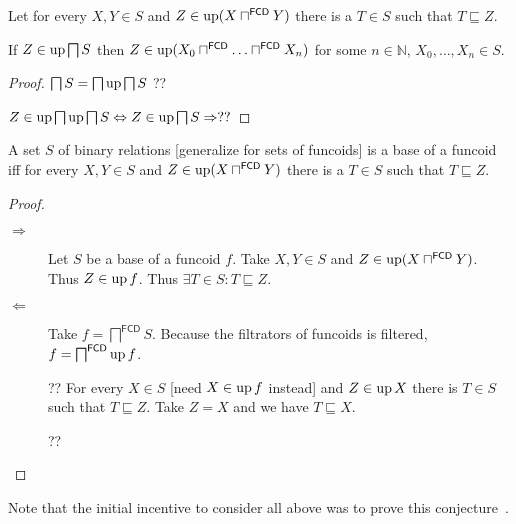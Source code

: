 \begin{lem}
  Let for every $X, Y \in S$ and $Z \in \operatorname{up} (X
  \sqcap^{\mathsf{FCD}} Y)$ there is a $T \in S$ such that $T
  \sqsubseteq Z$.
  
  If $Z \in \operatorname{up} \bigsqcap S$ then $Z \in \operatorname{up} (X_0
  \sqcap^{\mathsf{FCD}} \ldots \sqcap^{\mathsf{FCD}} X_n)$ for
  some $n \in \mathbb{N}$, $X_0, \ldots, X_n \in S$.
\end{lem}

\begin{proof}
  $\bigsqcap S = \bigsqcap \operatorname{up} \bigsqcap S$ ??
  
  $Z \in \operatorname{up} \bigsqcap \operatorname{up} \bigsqcap S \Leftrightarrow Z \in
  \operatorname{up} \bigsqcap S \Rightarrow ? ?$
\end{proof}

\begin{prop}
  A set $S$ of binary relations [generalize for sets of funcoids] is a base of
  a funcoid iff for every $X, Y \in S$ and $Z \in \operatorname{up} (X
  \sqcap^{\mathsf{FCD}} Y)$ there is a $T \in S$ such that $T
  \sqsubseteq Z$.
\end{prop}

\begin{proof}
  ~
  \begin{description}
    \item[$\Rightarrow$] Let $S$ be a base of a funcoid $f$. Take $X, Y \in S$
    and $Z \in \operatorname{up} (X \sqcap^{\mathsf{FCD}} Y)$. Thus $Z \in
    \operatorname{up} f$. Thus $\exists T \in S : T \sqsubseteq Z$.
    
    \item[$\Leftarrow$] Take $f = \bigsqcap^{\mathsf{FCD}} S$. Because
    the filtrators of funcoids is filtered, $f =
    \bigsqcap^{\mathsf{FCD}} \operatorname{up} f$.
    
    ?? For every $X \in S$ [need $X \in \operatorname{up} f$ instead] and $Z \in
    \operatorname{up} X$ there is $T \in S$ such that $T \sqsubseteq Z$. Take $Z = X$
    and we have $T \sqsubseteq X$.
    
    ??
  \end{description}
\end{proof}


Note that the initial incentive to consider all above was to prove this conjecture~.